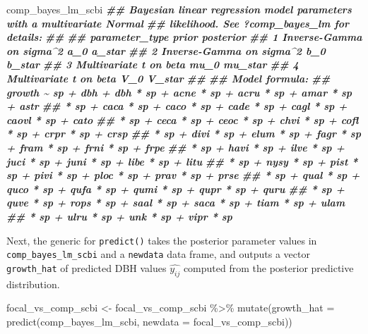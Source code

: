 \documentclass[12pt]{article}
\newenvironment{Shaded}{\begin{snugshade}}{\end{snugshade}}
\newcommand{\AttributeTok}[1]{\textcolor[rgb]{0.77,0.63,0.00}{#1}}
\newcommand{\DocumentationTok}[1]{\textcolor[rgb]{0.56,0.35,0.01}{\textbf{\textit{#1}}}}
\newcommand{\FunctionTok}[1]{\textcolor[rgb]{0.00,0.00,0.00}{#1}}
\newcommand{\NormalTok}[1]{#1}
\newcommand{\OtherTok}[1]{\textcolor[rgb]{0.56,0.35,0.01}{#1}}
\newcommand{\SpecialCharTok}[1]{\textcolor[rgb]{0.00,0.00,0.00}{#1}}
\begin{document}
\begin{Shaded}
\begin{Highlighting}[]
\NormalTok{comp\_bayes\_lm\_scbi}
\DocumentationTok{\#\# Bayesian linear regression model parameters with a multivariate Normal}
\DocumentationTok{\#\# likelihood. See ?comp\_bayes\_lm for details:}
\DocumentationTok{\#\# }
\DocumentationTok{\#\#   parameter\_type           prior posterior}
\DocumentationTok{\#\# 1 Inverse{-}Gamma on sigma\^{}2 a\_0   a\_star   }
\DocumentationTok{\#\# 2 Inverse{-}Gamma on sigma\^{}2 b\_0   b\_star   }
\DocumentationTok{\#\# 3 Multivariate t on beta   mu\_0  mu\_star  }
\DocumentationTok{\#\# 4 Multivariate t on beta   V\_0   V\_star   }
\DocumentationTok{\#\# }
\DocumentationTok{\#\# Model formula:}
\DocumentationTok{\#\# growth \textasciitilde{} sp + dbh + dbh * sp + acne * sp + acru * sp + amar * sp + astr}
\DocumentationTok{\#\# * sp + caca * sp + caco * sp + cade * sp + cagl * sp + caovl * sp + cato}
\DocumentationTok{\#\# * sp + ceca * sp + ceoc * sp + chvi * sp + cofl * sp + crpr * sp + crsp}
\DocumentationTok{\#\# * sp + divi * sp + elum * sp + fagr * sp + fram * sp + frni * sp + frpe}
\DocumentationTok{\#\# * sp + havi * sp + ilve * sp + juci * sp + juni * sp + libe * sp + litu}
\DocumentationTok{\#\# * sp + nysy * sp + pist * sp + pivi * sp + ploc * sp + prav * sp + prse}
\DocumentationTok{\#\# * sp + qual * sp + quco * sp + qufa * sp + qumi * sp + qupr * sp + quru}
\DocumentationTok{\#\# * sp + quve * sp + rops * sp + saal * sp + saca * sp + tiam * sp + ulam}
\DocumentationTok{\#\# * sp + ulru * sp + unk * sp + vipr * sp}
\end{Highlighting}
\end{Shaded}

Next, the generic for \texttt{predict()} takes the posterior parameter
values in \texttt{comp\_bayes\_lm\_scbi} and a \texttt{newdata} data
frame, and outputs a vector \texttt{growth\_hat} of predicted DBH values
\(\widehat{y_{ij}}\) computed from the posterior predictive
distribution.

\begin{Shaded}
\begin{Highlighting}[]
\NormalTok{focal\_vs\_comp\_scbi }\OtherTok{\textless{}{-}}\NormalTok{ focal\_vs\_comp\_scbi }\SpecialCharTok{\%\textgreater{}\%}
    \FunctionTok{mutate}\NormalTok{(}\AttributeTok{growth\_hat =} \FunctionTok{predict}\NormalTok{(comp\_bayes\_lm\_scbi, }\AttributeTok{newdata =}\NormalTok{ focal\_vs\_comp\_scbi))}
\end{Highlighting}
\end{Shaded}
\end{document}

